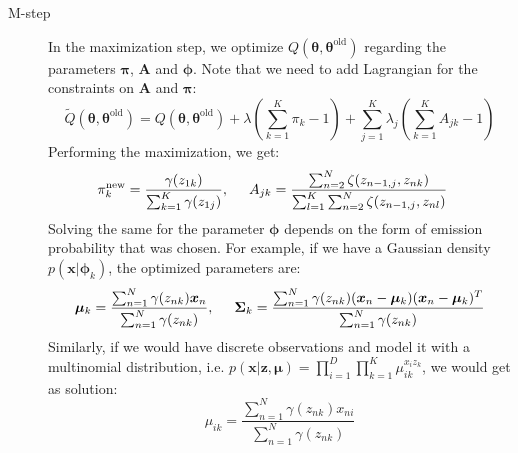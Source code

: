 \begin{itemize}
\begin{description}
		\item[M-step] In the maximization step, we optimize $Q(\bm{\theta}, \bm{\theta}^{\text{old}})$ regarding the parameters $\bm{\pi}$, $\bm{A}$ and $\bm{\phi}$. Note that we need to add Lagrangian for the constraints on $\bm{A}$ and $\bm{\pi}$:
		$$\tilde{Q}(\bm{\theta}, \bm{\theta}^{\text{old}}) = Q(\bm{\theta}, \bm{\theta}^{\text{old}}) + \lambda \left(\sum_{k=1}^{K} \pi_k - 1\right) + \sum_{j=1}^{K} \lambda_j \left(\sum_{k=1}^{K} A_{jk} - 1\right)$$
		Performing the maximization, we get:
		\begin{equation*}
			\begin{split}
				\pi_k^{\text{new}} & =\frac{\gamma(z_{1k})}{\sum_{k=1}^{K}\gamma(z_{1j})}, \hspace{5mm} A_{jk} = \frac{\sum_{n=2}^{N} \zeta(z_{n-1,j}, z_{nk})}{\sum_{l=1}^{K}\sum_{n=2}^{N} \zeta(z_{n-1,j}, z_{nl})}
			\end{split}
		\end{equation*}
		Solving the same for the parameter $\bm{\phi}$ depends on the form of emission probability that was chosen. For example, if we have a Gaussian density $p(\bm{x}|\bm{\phi}_k)$, the optimized parameters are:
		$$\bm{\mu}_k=\frac{\sum_{n=1}^{N}\gamma(z_{nk})\bm{x}_n}{\sum_{n=1}^{N}\gamma(z_{nk})}, \hspace{5mm} \bm{\Sigma}_k = \frac{\sum_{n=1}^{N} \gamma(z_{nk})(\bm{x}_n - \bm{\mu}_{k})(\bm{x}_n - \bm{\mu}_{k})^T}{\sum_{n=1}^{N} \gamma(z_{nk})}$$
		Similarly, if we would have discrete observations and model it with a multinomial distribution, i.e. $p(\bm{x}|\bm{z},\bm{\mu}) = \prod_{i=1}^{D}\prod_{k=1}^{K} \mu_{ik}^{x_i z_k}$, we would get as solution:
		$$\mu_{ik} = \frac{\sum_{n=1}^{N}\gamma(z_{nk})x_{ni}}{\sum_{n=1}^{N}\gamma(z_{nk})}$$
	\end{description}
	

\end{itemize}
